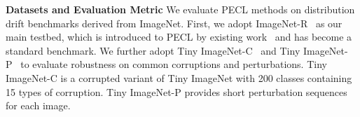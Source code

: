 \documentclass[10pt]{article} %
\begin{document}
\textbf{Datasets and Evaluation Metric}
We evaluate PECL methods on distribution drift benchmarks derived from ImageNet. First, we adopt ImageNet-R~\cite{ImagenetR_Hendrycks_2021_ICCV} as our main testbed, which is introduced to PECL by existing work~\cite{liangInfLoRAInterferenceFreeLowRank2024a} and has become a standard benchmark. We further adopt Tiny ImageNet-C~\cite{hendrycks2018benchmarking} and Tiny ImageNet-P~\cite{hendrycks2018benchmarking} to evaluate robustness on common corruptions and perturbations. Tiny ImageNet-C is a corrupted variant of Tiny ImageNet with 200 classes containing 15 types of corruption. Tiny ImageNet-P provides short perturbation sequences for each image.







\end{document}
